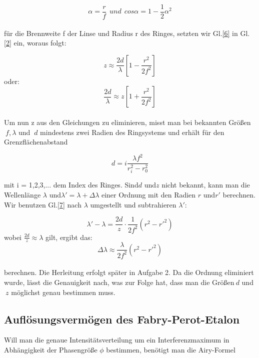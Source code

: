 \documentclass{article}
\begin{document}
\begin{equation}
\label{6}
\alpha = \frac {r}{f} \ \ und \ \ cos \alpha = 1- \frac {1}{2} \alpha ^2
\end{equation}\\

für die Brennweite f der Linse und Radius r des Ringes, setzten wir Gl.\eqref{6} in Gl.\eqref{2} ein, woraus folgt:

\begin{equation}
\label{7}
z \approx \frac {2d}{\lambda} \left [ 1-\frac {r^2}{2f^2} \right ]
\end{equation}
oder:
\begin{equation}
\frac {2d}{\lambda} \approx z \left [1+ \frac {r^2}{2f^2} \right ]
\end{equation}\\

Um nun z aus den Gleichungen zu eliminieren, misst man bei bekannten Größen \(\ f, \lambda \) und \(\ d \) mindestens zwei Radien des Ringsystems und erhält für den Grenzflächenabstand

\begin{equation}
\label{8}
d = i \frac {\lambda f^2}{r_{i}^2 - r_{0}^2}
\end{equation}

mit i = 1,2,3,... dem Index des Ringes.
Sind\(d \) und\(z \) nicht bekannt, kann man die Wellenlänge \(\lambda \) und\(\lambda ' =\lambda +\Delta \lambda \) einer Ordnung mit den Radien \(r \) und\(r' \) berechnen. Wir benutzen Gl.\eqref{7} nach $\lambda$ umgestellt und subtrahieren $\lambda '$:

\begin{equation}
\lambda ' -\lambda =\frac{2d}{z} \cdot \frac{1}{2f^2}(r^2-r'^2)
\end{equation}
wobei $\frac{2d}{z}\approx \lambda$ gilt, ergibt das:
\begin{equation}
\label{9}
\Delta \lambda \approx \frac {\lambda}{2f^2} (r^2 - r'^2)
\end{equation}\\

berechnen. Die Herleitung erfolgt später in Aufgabe 2. Da die Ordnung eliminiert wurde, lässt die Genauigkeit nach, was zur Folge hat, dass man die Größen\(\ d \) und\(\ z \) möglichst genau bestimmen muss.\\

\subsection{Auflösungsvermögen des Fabry-Perot-Etalon} 
Will man die genaue Intensitätsverteilung um ein Interferenzmaximum in Abhängigkeit der Phasengröße \(\phi \) bestimmen, benötigt man die {\sc Airy-Formel}
\end{document}
